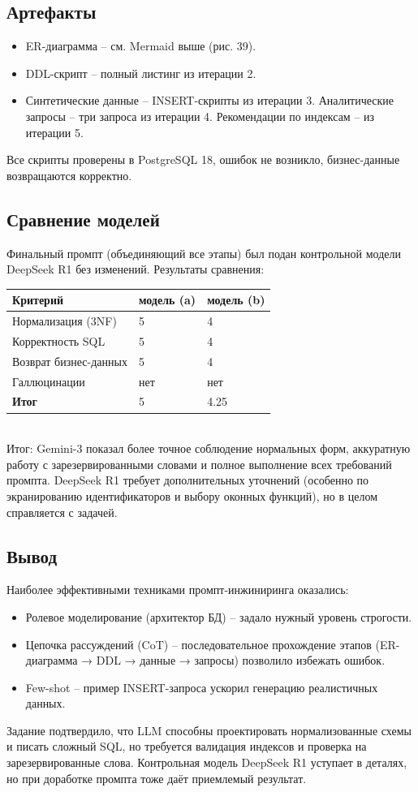 \subsection{Артефакты}
\begin{itemize}
	\item ER-диаграмма – см. Mermaid выше (рис. 39).
	\item DDL-скрипт – полный листинг из итерации 2.
	\item Синтетические данные – INSERT-скрипты из итерации 3.
	Аналитические запросы – три запроса из итерации 4.
	Рекомендации по индексам – из итерации 5.
\end{itemize}
Все скрипты проверены в PostgreSQL 18, ошибок не возникло, бизнес-данные возвращаются корректно.
\subsection{Сравнение моделей}
Финальный промпт (объединяющий все этапы) был подан контрольной модели DeepSeek R1 без изменений.
Результаты сравнения:
\begin{table}[h!]
	\centering
	\begin{tabular}{|l|p{5cm}|p{5cm}|}
		\hline
		\textbf{Критерий} & \textbf{модель (a)} & \textbf{модель (b)} \\
		\hline
		Нормализация (3NF) & 5 & 4 \\
		\hline
		Корректность SQL  & 5 & 4\\
		\hline
		Возврат бизнес-данных & 5 & 4 \\
		\hline
		Галлюцинации & нет & нет \\
		\hline
		\textbf{Итог} & 5 & 4.25\\
		\hline
	\end{tabular}
\end{table} \\
Итог: Gemini-3 показал более точное соблюдение нормальных форм, аккуратную работу с зарезервированными словами и полное выполнение всех требований промпта. DeepSeek R1 требует дополнительных уточнений (особенно по экранированию идентификаторов и выбору оконных функций), но в целом справляется с задачей.
\subsection{Вывод}
Наиболее эффективными техниками промпт-инжиниринга оказались:
\begin{itemize}
	\item Ролевое моделирование (архитектор БД) – задало нужный уровень строгости.
	\item Цепочка рассуждений (CoT) – последовательное прохождение этапов (ER-диаграмма → DDL → данные → запросы) позволило избежать ошибок.
	\item Few-shot – пример INSERT-запроса ускорил генерацию реалистичных данных.
\end{itemize}
Задание подтвердило, что LLM способны проектировать нормализованные схемы и писать сложный SQL, но требуется валидация индексов и проверка на зарезервированные слова. Контрольная модель DeepSeek R1 уступает в деталях, но при доработке промпта тоже даёт приемлемый результат.